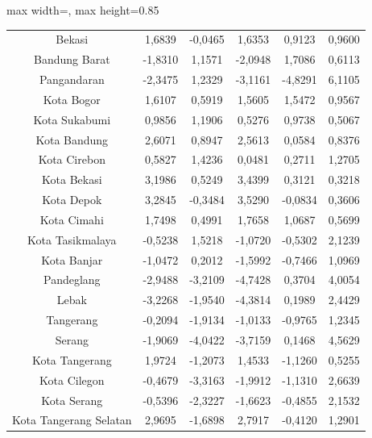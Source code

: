 \begin{table}[H]
\begin{adjustbox}{max width=\textwidth, max height=0.85\textheight}
\begin{tabular}{|c|c|c|c|c|c|}
Bekasi & 1,6839 & -0,0465 & 1,6353 & 0,9123 & 0,9600 \\
Bandung Barat & -1,8310 & 1,1571 & -2,0948 & 1,7086 & 0,6113 \\
Pangandaran & -2,3475 & 1,2329 & -3,1161 & -4,8291 & 6,1105 \\
Kota Bogor & 1,6107 & 0,5919 & 1,5605 & 1,5472 & 0,9567 \\
Kota Sukabumi & 0,9856 & 1,1906 & 0,5276 & 0,9738 & 0,5067 \\
Kota Bandung & 2,6071 & 0,8947 & 2,5613 & 0,0584 & 0,8376 \\
Kota Cirebon & 0,5827 & 1,4236 & 0,0481 & 0,2711 & 1,2705 \\
Kota Bekasi & 3,1986 & 0,5249 & 3,4399 & 0,3121 & 0,3218 \\
Kota Depok & 3,2845 & -0,3484 & 3,5290 & -0,0834 & 0,3606 \\
Kota Cimahi & 1,7498 & 0,4991 & 1,7658 & 1,0687 & 0,5699 \\
Kota Tasikmalaya & -0,5238 & 1,5218 & -1,0720 & -0,5302 & 2,1239 \\
Kota Banjar & -1,0472 & 0,2012 & -1,5992 & -0,7466 & 1,0969 \\
Pandeglang & -2,9488 & -3,2109 & -4,7428 & 0,3704 & 4,0054 \\
Lebak & -3,2268 & -1,9540 & -4,3814 & 0,1989 & 2,4429 \\
Tangerang & -0,2094 & -1,9134 & -1,0133 & -0,9765 & 1,2345 \\
Serang & -1,9069 & -4,0422 & -3,7159 & 0,1468 & 4,5629 \\
Kota Tangerang & 1,9724 & -1,2073 & 1,4533 & -1,1260 & 0,5255 \\
Kota Cilegon & -0,4679 & -3,3163 & -1,9912 & -1,1310 & 2,6639 \\
Kota Serang & -0,5396 & -2,3227 & -1,6623 & -0,4855 & 2,1532 \\
Kota Tangerang Selatan & 2,9695 & -1,6898 & 2,7917 & -0,4120 & 1,2901 \\
\hline
\end{tabular}
\end{adjustbox}
\end{table}